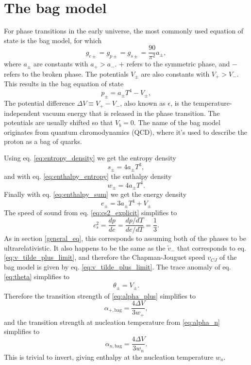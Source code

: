 \section{The bag model}
\label{bag_model}
For phase transitions in the early universe,
the most commonly used equation of state is the bag model, for which
\begin{equation}
g_{e\pm} = g_{p\pm} = g_{s\pm} = \frac{90}{\pi^2} a_\pm,
\end{equation}
where $a_\pm$ are constants with $a_+ > a_-$.
$+$ refers to the symmetric phase, and $-$ refers to the broken phase.
The potentials $V_\pm$ are also constants with $V_+ > V_-$.
This results in the bag equation of state
\cites[eq. 7.33]{lecture_notes}[eq. 8-9]{giese_2020}
\begin{equation}
p_\pm = a_\pm T^4 - V_\pm,
\label{eq:bag_p}
\end{equation}
The potential difference $\Delta V \equiv V_+ - V_-$, also known as $\epsilon$, is the temperature-independent vacuum energy that is released in the phase transition.
The potentials are usually shifted so that $V_b = 0$.
The name of the bag model originates from quantum chromodynamics (QCD), where it's used to describe the proton as a bag of quarks.
\cite{giese_2020}

Using eq. \eqref{eq:entropy_density} we get the entropy density
\begin{equation}
s_\pm = 4 a_\pm T^3,
\end{equation}
and with eq. \eqref{eq:enthalpy_entropy} the enthalpy density
\begin{equation}
w_\pm = 4 a_\pm T^4.
\end{equation}
Finally with eq. \eqref{eq:enthalpy_sum} we get the energy density
\begin{equation}
e_\pm = 3 a_\pm T^4 + V_\pm
\end{equation}
The speed of sound from eq. \eqref{eq:cs2_explicit} simplifies to
\begin{equation}
c_s^2 = \frac{dp}{de} = \frac{dp/dT}{de/dT} = \frac{1}{3}.
\end{equation}
As in section \ref{general_eq}, this corresponds to assuming both of the phases to be ultrarelativistic.
It also happens to be the same as the $\tilde{v}_-$ that corresponds to eq. \eqref{eq:v_tilde_plus_limit}, and therefore the Chapman-Jouguet speed $v_{CJ}$ of the bag model is given by eq. \eqref{eq:v_tilde_plus_limit}.
The trace anomaly of eq. \eqref{eq:theta} simplifies to
\begin{align}
\theta_\pm = V_\pm.
\end{align}
Therefore the transition strength of \eqref{eq:alpha_plus} simplifies to
\begin{equation}
\alpha_{+,\text{bag}} = \frac{4 \Delta V}{3 w_+},
\label{eq:alpha_plus_bag}
\end{equation}
and the transition strength at nucleation temperature from \eqref{eq:alpha_n} simplifies to
\begin{equation}
\alpha_{n,\text{bag}} = \frac{4 \Delta V}{3 w_n}.
\label{eq:alpha_n_bag}
\end{equation}
This is trivial to invert, giving enthalpy at the nucleation temperature $w_n$.
